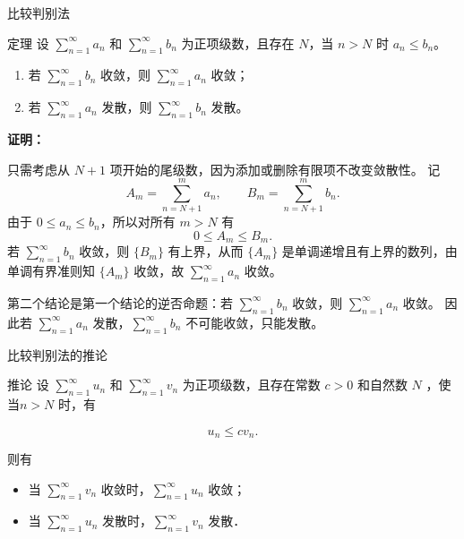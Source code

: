 \documentclass[aspectratio=169,10pt]{ctexbeamer}
\begin{document}
\begin{frame}{比较判别法}
	\scriptsize
	\begin{block}{定理}
		设 \(\sum\limits_{n = 1}^{  \infty } a_n\) 和 \(\sum\limits_{n = 1}^{  \infty } b_n\) 为正项级数，且存在 \(N\)，当 \(n > N\) 时 \(a_n \leq b_n\)。
		\begin{enumerate}
			\item 若 \(\sum\limits_{n = 1}^{  \infty } b_n\) 收敛，则 \(\sum\limits_{n = 1}^{  \infty } a_n\) 收敛；
			\item 若 \(\sum\limits_{n = 1}^{  \infty } a_n\) 发散，则 \(\sum\limits_{n = 1}^{  \infty } b_n\) 发散。
		\end{enumerate}
	\end{block}
	
	\textbf{证明：}
	
	只需考虑从 $N+1$ 项开始的尾级数，因为添加或删除有限项不改变敛散性。 记
	\[
	A_m=\sum_{n=N+1}^{m}a_n,\qquad B_m=\sum_{n=N+1}^{m}b_n.
	\]
	由于 $0\le a_n\le b_n$，所以对所有 $m>N$ 有
	\[
	0\le A_m\le B_m.
	\]
	若 $\sum\limits_{n = 1}^{  \infty } b_n$ 收敛，则 $\{B_m\}$ 有上界，从而 $\{A_m\}$ 是单调递增且有上界的数列，由单调有界准则知 $\{A_m\}$ 收敛，故 $\sum\limits_{n = 1}^{  \infty } a_n$ 收敛。
	
	第二个结论是第一个结论的逆否命题：若 $\sum\limits_{n = 1}^{  \infty } b_n$ 收敛，则 $\sum\limits_{n = 1}^{  \infty } a_n$ 收敛。 因此若 $\sum\limits_{n = 1}^{  \infty } a_n$ 发散，$\sum\limits_{n = 1}^{  \infty } b_n$ 不可能收敛，只能发散。
	
	
	
\end{frame}

\begin{frame}{比较判别法的推论}
	\begin{block}{推论}
			设 $\sum\limits_{n = 1}^{  \infty } u_n$ 和 $\sum\limits_{n = 1}^{  \infty } v_n$ 为正项级数，且存在常数 $c>0$ 和自然数 $N$ ，使当$n>N$ 时，有
		
		$$
		u_n \leqslant c v_n .
		$$
		
		则有
		\begin{itemize}
			\item[（1）] 当 $\sum\limits_{n = 1}^{  \infty } v_n$ 收敛时，$\sum\limits_{n = 1}^{  \infty } u_n$ 收敛；
			\item[（2）] 当 $\sum\limits_{n = 1}^{  \infty } u_n$ 发散时，$\sum\limits_{n = 1}^{  \infty } v_n$ 发散．
		\end{itemize}
	\end{block}
\end{frame}
\end{document}
